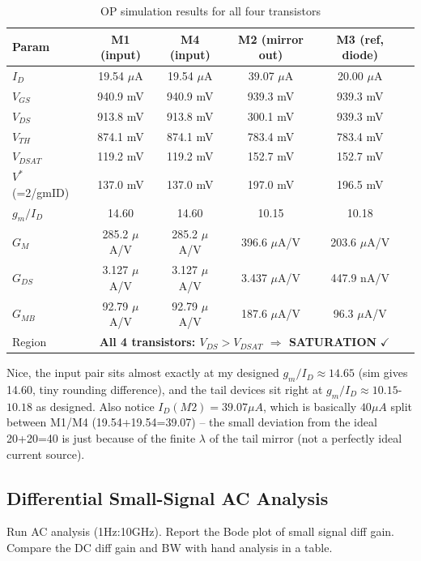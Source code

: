 \documentclass[11pt]{article}
\begin{document}
\begin{table}[H]
\centering
\small
\begin{tabular}{lccccc}
\toprule
\textbf{Param} & \textbf{M1 (input)} & \textbf{M4 (input)} & \textbf{M2 (mirror out)} & \textbf{M3 (ref, diode)} \\
\midrule
$I_D$        & 19.54 $\mu$A & 19.54 $\mu$A & 39.07 $\mu$A & 20.00 $\mu$A \\
$V_{GS}$     & 940.9 mV     & 940.9 mV     & 939.3 mV     & 939.3 mV \\
$V_{DS}$     & 913.8 mV     & 913.8 mV     & 300.1 mV     & 939.3 mV \\
$V_{TH}$     & 874.1 mV     & 874.1 mV     & 783.4 mV     & 783.4 mV \\
$V_{DSAT}$   & 119.2 mV     & 119.2 mV     & 152.7 mV     & 152.7 mV \\
$V^*$ (=2/gmID) & 137.0 mV  & 137.0 mV     & 197.0 mV     & 196.5 mV \\
$g_m/I_D$    & 14.60        & 14.60        & 10.15        & 10.18 \\
$G_M$        & 285.2 $\mu$A/V & 285.2 $\mu$A/V & 396.6 $\mu$A/V & 203.6 $\mu$A/V \\
$G_{DS}$     & 3.127 $\mu$A/V & 3.127 $\mu$A/V & 3.437 $\mu$A/V & 447.9 nA/V \\
$G_{MB}$     & 92.79 $\mu$A/V & 92.79 $\mu$A/V & 187.6 $\mu$A/V & 96.3 $\mu$A/V \\
\midrule
Region       & \multicolumn{4}{c}{\textbf{All 4 transistors: $V_{DS} > V_{DSAT}$ $\Rightarrow$ SATURATION} $\checkmark$} \\
\bottomrule
\end{tabular}
\caption{OP simulation results for all four transistors}
\end{table}

Nice, the input pair sits almost exactly at my designed $g_m/I_D\approx14.65$ (sim gives 14.60, tiny rounding
difference), and the tail devices sit right at $g_m/I_D\approx10.15$-$10.18$ as designed. Also notice $I_D(M2)=39.07\mu A$,
which is basically $40\mu A$ split between M1/M4 (19.54+19.54=39.07) -- the small deviation from the ideal
20+20=40 is just because of the finite $\lambda$ of the tail mirror (not a perfectly ideal current source).

\subsection{Differential Small-Signal AC Analysis}
\begin{qbox}
Run AC analysis (1Hz:10GHz). Report the Bode plot of small signal diff gain. Compare the DC diff gain and BW
with hand analysis in a table.
\end{qbox}
\end{document}
